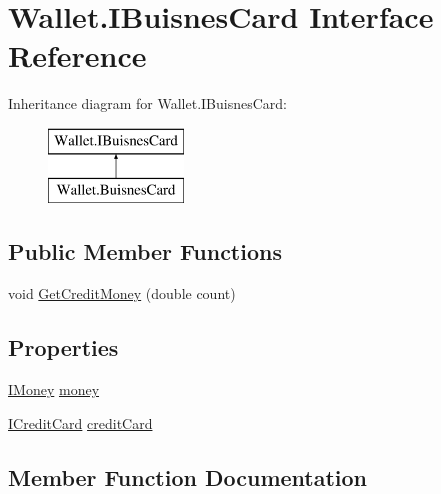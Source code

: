 \hypertarget{interface_wallet_1_1_i_buisnes_card}{}\section{Wallet.\+I\+Buisnes\+Card Interface Reference}
\label{interface_wallet_1_1_i_buisnes_card}
Inheritance diagram for Wallet.\+I\+Buisnes\+Card\+:\begin{figure}[H]
\begin{center}
\leavevmode
\includegraphics[height=2.000000cm]{interface_wallet_1_1_i_buisnes_card}
\end{center}
\end{figure}
\subsection*{Public Member Functions}
\begin{DoxyCompactItemize}
\item 
void \hyperlink{interface_wallet_1_1_i_buisnes_card_a72149f132af46a0884b2a7929bfc63bb}{Get\+Credit\+Money} (double count)
\end{DoxyCompactItemize}
\subsection*{Properties}
\begin{DoxyCompactItemize}
\item 
\hyperlink{interface_wallet_1_1_i_money}{I\+Money} \hyperlink{interface_wallet_1_1_i_buisnes_card_aec4923ff6cdbd90be1f3ecb28d19501b}{money}
\item 
\hyperlink{interface_wallet_1_1_i_credit_card}{I\+Credit\+Card} \hyperlink{interface_wallet_1_1_i_buisnes_card_a53715ee7f0484407fe5a238a1f442148}{credit\+Card}
\end{DoxyCompactItemize}


\subsection{Member Function Documentation}
\hypertarget{interface_wallet_1_1_i_buisnes_card_a72149f132af46a0884b2a7929bfc63bb}{}\label{interface_wallet_1_1_i_buisnes_card_a72149f132af46a0884b2a7929bfc63bb} 
